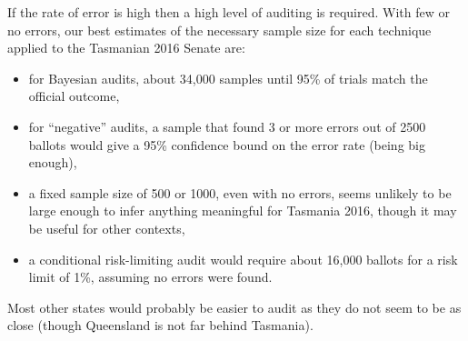 \documentclass[10pt,a4paper]{article}
\begin{document}
If the rate of error is high then a high level of auditing is required.  With few or no errors, our best estimates of the necessary sample size for each technique applied to the Tasmanian 2016 Senate are:
\begin{itemize}
	\item for Bayesian audits, about 34,000 samples until 95\% of trials match the official outcome,
	\item for ``negative'' audits, a sample that found 3 or more errors out of 2500 ballots would give a 95\% confidence bound on the error rate (being big enough),
	\item a fixed sample size of 500 or 1000, even with no errors, seems unlikely to be large enough to infer anything meaningful for Tasmania 2016, though it may be useful for other contexts,
	\item a conditional risk-limiting audit  would require about 16,000 ballots for a risk limit of 1\%, assuming no errors were found.
\end{itemize}

Most other states would probably be easier to audit as they do not seem to be as close (though Queensland is not far behind Tasmania).
\end{document}
